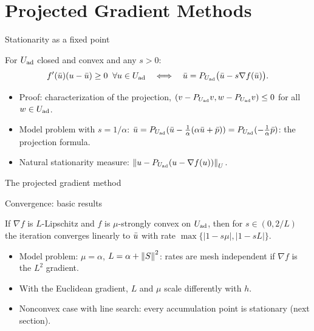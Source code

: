 \documentclass[main.tex]{subfiles}
\begin{document}
\section{Projected Gradient Methods}

\begin{frame}{Stationarity as a fixed point}
  \begin{lemma}
    For $U_{\mathrm{ad}}$ closed and convex and any $s > 0$:
    \[
      f'(\bar u)(u - \bar u) \ge 0 \;\;\forall u \in U_{\mathrm{ad}}
      \quad\Longleftrightarrow\quad
      \bar u = P_{U_{\mathrm{ad}}}\big(\bar u - s\nabla f(\bar u)\big).
    \]
  \end{lemma}
  \begin{itemize}
    \item Proof: characterization of the projection, $\left( v - P_{U_{\mathrm{ad}}} v, w - P_{U_{\mathrm{ad}}} v \right) \le 0$ for all $w \in U_{\mathrm{ad}}$.
    \item Model problem with $s = 1/\alpha$: $\bar u = P_{U_{\mathrm{ad}}}(\bar u - \tfrac1\alpha(\alpha\bar u + \bar p)) = P_{U_{\mathrm{ad}}}(-\tfrac1\alpha\bar p)$: the projection formula.
    \item Natural stationarity measure: $\left\lVert u - P_{U_{\mathrm{ad}}}(u - \nabla f(u)) \right\rVert_U$.
  \end{itemize}
\end{frame}

\begin{frame}{The projected gradient method}
  \begin{algorithm}[H]
    \caption{Projected gradient method in $U$}
  \end{algorithm}
\end{frame}

\begin{frame}{Convergence: basic results}
  \begin{theorem}
    If $\nabla f$ is $L$-Lipschitz and $f$ is $\mu$-strongly convex on $U_{\mathrm{ad}}$, then for $s \in (0, 2/L)$ the iteration converges linearly to $\bar u$ with rate $\max\{|1 - s\mu|, |1 - sL|\}$.
  \end{theorem}
  \begin{itemize}
    \item Model problem: $\mu = \alpha$, $L = \alpha + \left\lVert S \right\rVert^2$: rates are \alert{mesh independent} if $\nabla f$ is the $L^2$ gradient.
    \item With the Euclidean gradient, $L$ and $\mu$ scale differently with $h$.
    \item Nonconvex case with line search: every accumulation point is stationary (next section).
  \end{itemize}
\end{frame}
\end{document}
